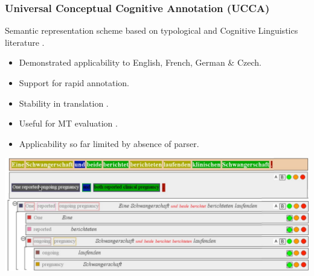 \documentclass[t]{beamer}
\begin{document}
\begin{frame}
\frametitle{Universal Conceptual Cognitive Annotation (UCCA)}
Semantic representation scheme \cite{abend2013universal}
based on typological and Cognitive Linguistics literature \cite{Dixon:basic,croft2004cognitive}.
\begin{itemize}
 \item Demonstrated applicability to English, French, German \& Czech.
 \item Support for rapid annotation.
 \pause
 \item Stability in translation \cite{sulem2015conceptual}.
 \item Useful for MT evaluation \cite{birch2016hume}.
 \item Applicability so far limited by absence of parser.
\end{itemize}

\vfill
\begin{center}
  \includegraphics[width=\linewidth]{hume.png}
\end{center}
\end{frame}
\end{document}
